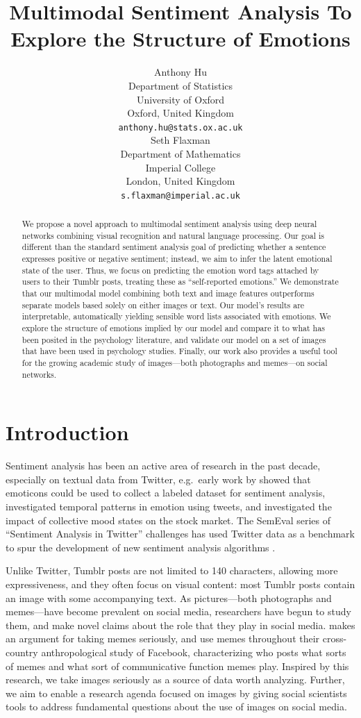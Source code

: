 \documentclass{article} %
\title{Multimodal Sentiment Analysis To Explore the Structure of Emotions}
\author{Anthony Hu \\
Department of Statistics \\
University of Oxford \\
Oxford, United Kingdom \\
\texttt{anthony.hu@stats.ox.ac.uk} \\
\And
Seth Flaxman \\
Department of Mathematics \\
Imperial College \\
London, United Kingdom \\
\texttt{s.flaxman@imperial.ac.uk}
}
\begin{document}
\maketitle

\begin{abstract}
We propose a novel approach to multimodal sentiment analysis using deep neural networks  combining visual recognition and natural language processing. Our goal is different than the standard sentiment analysis goal of predicting whether a sentence expresses positive or negative sentiment; instead, we aim to infer the latent emotional state of the user. Thus, we focus on predicting the emotion word tags attached by users to their Tumblr posts, treating these as ``self-reported emotions.''  We demonstrate that our multimodal model combining both text and image features outperforms separate models based solely on either images or text. Our model's results are interpretable, automatically yielding sensible word lists associated with emotions. We explore the structure of emotions implied by our model and compare it to what has been posited in the psychology literature, and validate our model on a set of images that have been used in psychology studies. Finally, our work also provides a useful tool for the growing academic study of images---both photographs and memes---on social networks. 
\end{abstract}

\section{Introduction}
Sentiment analysis has been an active area of research in the past decade, especially on textual data from Twitter, e.g.~early work by \citet{pak2010twitter} showed that emoticons could be used to collect a labeled dataset for sentiment analysis, \citet{golder2011diurnal} investigated temporal patterns in emotion using tweets, and \citet{Bollen} investigated the impact of collective mood states on the stock market. The SemEval series of ``Sentiment Analysis in Twitter'' challenges has used Twitter data as a benchmark to spur the development of new sentiment analysis algorithms \citep{rosenthal2017semeval}.

Unlike Twitter, Tumblr posts are not limited to 140 characters, allowing more expressiveness, and they often focus on visual content: most Tumblr posts contain an image with some accompanying text. As pictures---both photographs and memes---have become prevalent on social media, researchers have begun to study them, and make novel claims about the role that they play in social media.  \citet{shifman2014memes} makes an argument for taking memes seriously, and  \citet{miller2017visualising} use memes throughout their cross-country  anthropological study of Facebook, characterizing who posts what sorts of memes and what sort of communicative function memes play. Inspired by this research, we take images seriously as a source of data worth analyzing. Further, we aim to enable a research agenda focused on images by giving social scientists tools to address fundamental questions about the use of images on social media. 
\end{document}
